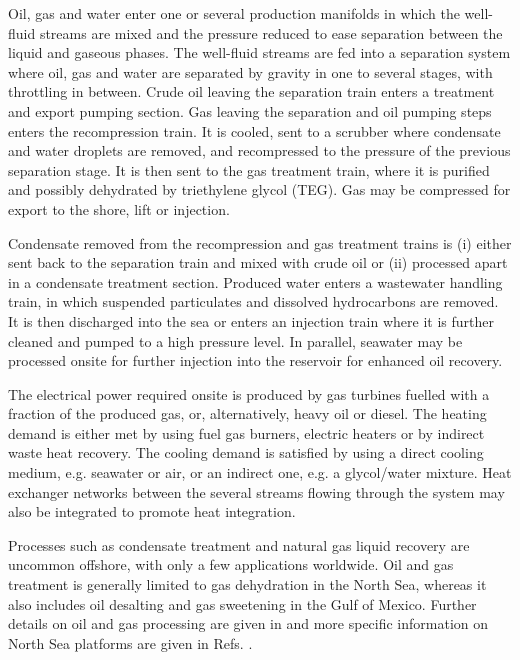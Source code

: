 \documentclass[times,3p]{elsarticle}
\begin{document}
Oil, gas and water enter one or several production manifolds in which the well-fluid streams are mixed and the pressure reduced to ease separation between the liquid and gaseous phases. The well-fluid streams are fed into a separation system where oil, gas and water are separated by gravity in one to several stages, with throttling in between. Crude oil leaving the separation train enters a treatment and export pumping section. Gas leaving the separation and oil pumping steps enters the recompression train. It is cooled, sent to a scrubber where condensate and water droplets are removed, and recompressed to the pressure of the previous separation stage. It is then sent to the gas treatment train, where it is purified and possibly dehydrated by triethylene glycol (TEG). Gas may be compressed for export to the shore, lift or injection. 

Condensate removed from the recompression and gas treatment trains is (i) either sent back to the separation train and mixed with crude oil or (ii) processed apart in a condensate treatment section. Produced water enters a wastewater handling train, in which suspended particulates and dissolved hydrocarbons are removed. It is then discharged into the sea or enters an injection train where it is further cleaned and pumped to a high pressure level. In parallel, seawater may be processed onsite for further injection into the reservoir for enhanced oil recovery. 
	
The electrical power required onsite is produced by gas turbines fuelled with a fraction of the produced gas, or, alternatively, heavy oil or diesel. The heating demand is either met by using fuel gas burners, electric heaters or by indirect waste heat recovery. The cooling demand is satisfied by using a direct cooling medium, e.g. seawater or air, or an indirect one, e.g. a glycol/water mixture. Heat exchanger networks between the several streams flowing through the system may also be integrated to promote heat integration.

Processes such as condensate treatment and natural gas liquid recovery are uncommon offshore, with only a few applications worldwide. Oil and gas treatment is generally limited to gas dehydration in the North Sea, whereas it also includes oil desalting and gas sweetening in the Gulf of Mexico. Further details on oil and gas processing are given in \cite{Manning1991a} and more specific information on North Sea platforms are given in Refs. \cite{Bothamley2004,Nguyen2013}.
\end{document}
